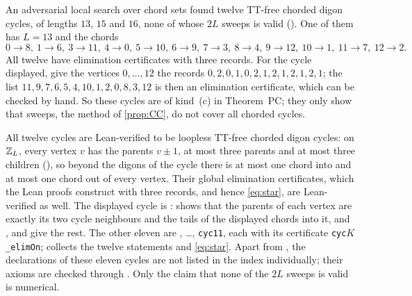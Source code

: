 \begin{remark}\label{rem:sweeps}
An adversarial local search over chord sets found twelve TT-free chorded digon cycles, of lengths $13$, $15$ and $16$,
none of whose $2L$ sweeps is valid (). One of them has $L=13$ and the chords
\[
 0\to8,\ 1\to6,\ 3\to11,\ 4\to0,\ 5\to10,\ 6\to9,\ 7\to3,\ 8\to4,\ 9\to12,\ 10\to1,\ 11\to7,\ 12\to2.
\]
All twelve have elimination certificates with three records. For the cycle displayed, give the vertices
$0,\dots,12$ the records $0,2,0,1,0,2,1,2,1,2,1,2,1$; the list $11,9,7,6,5,4,10,1,2,0,8,3,12$ is then an elimination
certificate, which can be checked by hand. So these cycles are of kind~(c) in Theorem~PC; they only show that sweeps, the
method of \cref{prop:CC}, do not cover all chorded cycles.

All twelve cycles are Lean-verified to be loopless TT-free chorded digon cycles: on $\mathbb{Z}_L$, every vertex $v$ has the
parents $v\pm1$, at most three parents and at most three children (), so beyond the digons of the
cycle there is at most one chord into and at most one chord out of every vertex. Their global elimination
certificates, which the Lean proofs construct with three records, and hence \eqref{eq:star}, are Lean-verified as well.
The displayed cycle is :  shows that the parents of each vertex are exactly its two cycle
neighbours and the tails of the displayed chords into it, and ,  and
 give the rest. The other eleven are , \dots, \texttt{cyc11}, each with its
certificate \texttt{cyc$K$\_elimOn};  collects the twelve statements  and
\eqref{eq:star}. Apart from , the declarations of these eleven cycles are not listed in the index
individually; their axioms are checked through . Only the claim that none of the $2L$ sweeps is
valid is numerical.
\end{remark}


